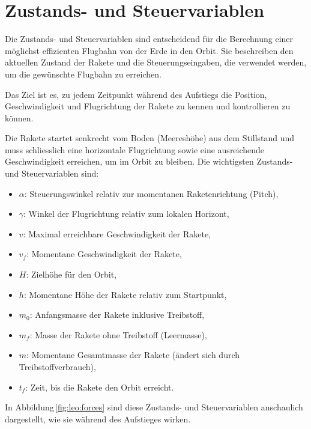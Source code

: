 %
%
%
%

\section{Zustands- und Steuervariablen \label{leo:section:variabeln}}

Die Zustands- und Steuervariablen sind entscheidend für die Berechnung einer möglichst effizienten Flugbahn von der Erde in den Orbit. 
Sie beschreiben den aktuellen Zustand der Rakete und die Steuerungseingaben, die verwendet werden, um die gewünschte Flugbahn zu erreichen. 

Das Ziel ist es, zu jedem Zeitpunkt während des Aufstiegs die Position, Geschwindigkeit und Flugrichtung der Rakete zu kennen und kontrollieren zu können. 

Die Rakete startet senkrecht vom Boden (Meereshöhe) aus dem Stillstand und muss schliesslich eine horizontale Flugrichtung sowie eine ausreichende Geschwindigkeit erreichen, um im Orbit zu bleiben. 
Die wichtigsten Zustands- und Steuervariablen sind:
\begin{itemize}
	\item \(\alpha\): Steuerungswinkel relativ zur momentanen Raketenrichtung (Pitch),
	\item \(\gamma\): Winkel der Flugrichtung relativ zum lokalen Horizont,
	\item \(v\): Maximal erreichbare Geschwindigkeit der Rakete,
	\item \(v_f\): Momentane Geschwindigkeit der Rakete,
	\item \(H\): Zielhöhe für den Orbit,
	\item \(h\): Momentane Höhe der Rakete relativ zum Startpunkt,
	\item \(m_0\): Anfangsmasse der Rakete inklusive Treibstoff,
	\item \(m_f\): Masse der Rakete ohne Treibstoff (Leermasse),
	\item \(m\): Momentane Gesamtmasse der Rakete (ändert sich durch Treibstoffverbrauch),
	\item \(t_f\): Zeit, bis die Rakete den Orbit erreicht.
\end{itemize}
\noindent In Abbildung\,\ref{fig:leo:forces} sind diese Zustands- und Steuervariablen anschaulich dargestellt, wie sie während des Aufstieges wirken.

